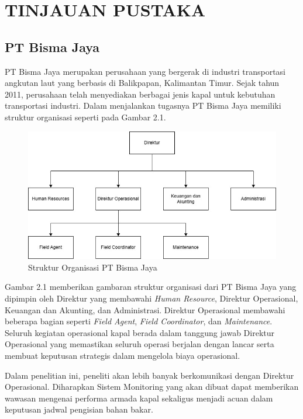 \chapter{TINJAUAN PUSTAKA}

\section{PT Bisma Jaya}

PT Bisma Jaya merupakan perusahaan yang bergerak di industri transportasi angkutan laut yang berbasis di Balikpapan, Kalimantan Timur. Sejak tahun 2011, perusahaan telah menyediakan berbagai jenis kapal untuk kebutuhan transportasi industri. Dalam menjalankan tugasnya PT Bisma Jaya memiliki struktur organisasi seperti pada Gambar 2.1.

\begin{figure}[!h]
    \includegraphics[width=1\linewidth, center]{images/tinjauan-pustaka/fig-org-structure.jpg}
    \caption{Struktur Organisasi PT Bisma Jaya}
    \label{fig:org-structure}
\end{figure}

Gambar 2.1 memberikan gambaran struktur organisasi dari PT Bisma Jaya yang dipimpin oleh Direktur yang membawahi \textit{Human Resource}, Direktur Operasional, Keuangan dan Akunting, dan Administrasi. Direktur Operasional membawahi beberapa bagian seperti \textit{Field Agent}, \textit{Field Coordinator}, dan \textit{Maintenance}. Seluruh kegiatan operasional kapal berada dalam tanggung jawab Direktur Operasional yang memastikan seluruh operasi berjalan dengan lancar serta membuat keputusan strategis dalam mengelola biaya operasional.

Dalam penelitian ini, peneliti akan lebih banyak berkomunikasi dengan Direktur Operasional. Diharapkan Sistem Monitoring yang akan dibuat dapat memberikan wawasan mengenai performa armada kapal sekaligus menjadi acuan dalam keputusan jadwal pengisian bahan bakar.


